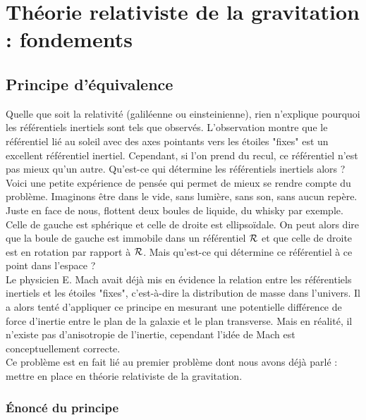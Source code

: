 \documentclass[a4paper,11pt]{report}
\begin{document}
\chapter{Théorie relativiste de la gravitation : fondements}

    \section{Principe d'équivalence}
    
        Quelle que soit la relativité (galiléenne ou einsteinienne), rien n'explique pourquoi les référentiels inertiels sont tels que observés. L'observation montre que le référentiel lié au soleil avec des axes pointants vers les étoiles "fixes" est un excellent référentiel inertiel. Cependant, si l'on prend du recul, ce référentiel n'est pas mieux qu'un autre. Qu'est-ce qui détermine les référentiels inertiels alors ?\\
            
        Voici une petite expérience de pensée qui permet de mieux se rendre compte du problème. Imaginons être dans le vide, sans lumière, sans son, sans aucun repère. Juste en face de nous, flottent deux boules de liquide, du whisky par exemple. Celle de gauche est sphérique et celle de droite est ellipsoïdale. On peut alors dire que la boule de gauche est immobile dans un référentiel $\mathcal{R}$ et que celle de droite est en rotation par rapport à $\mathcal{R}$. Mais qu'est-ce qui détermine ce référentiel à ce point dans l'espace ?\\
        
        Le physicien E. Mach avait déjà mis en évidence la relation entre les référentiels inertiels et les étoiles "fixes", c'est-à-dire la distribution de masse dans l'univers. Il a alors tenté d'appliquer ce principe en mesurant une potentielle différence de force d'inertie entre le plan de la galaxie et le plan transverse. Mais en réalité, il n'existe pas d'anisotropie de l'inertie, cependant l'idée de Mach est conceptuellement correcte.\\
        
        Ce problème est en fait lié au premier problème dont nous avons déjà parlé : mettre en place en théorie relativiste de la gravitation.
    
        \subsection{Énoncé du principe}
        
\end{document}
